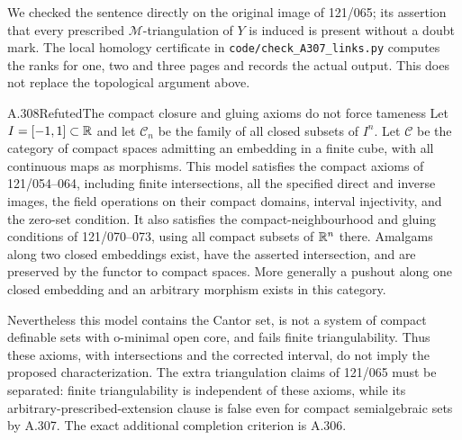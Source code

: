 We checked the sentence directly on the original image of 121/065;
its assertion that every prescribed $\mathcal M$-triangulation of $Y$
is induced is present without a doubt mark. The local homology
certificate in \texttt{code/check\_A307\_links.py} computes the ranks
for one, two and three pages and records the actual output. This
does not replace the topological argument above.

\begin{saresult}{A.308}{Refuted}{The compact closure and gluing axioms do not force tameness}
Let $I=[-1,1]\subset\mathbb R$ and let $\mathcal C_n$ be the family of
all closed subsets of $I^n$. Let $\mathcal C$ be the category of
compact spaces admitting an embedding in a finite cube, with all
continuous maps as morphisms. This model satisfies the compact
axioms of 121/054--064, including finite intersections, all the
specified direct and inverse images, the field operations on their
compact domains, interval injectivity, and the zero-set condition.
It also satisfies the compact-neighbourhood and gluing conditions
of 121/070--073, using all compact subsets of $\mathbb R^n$ there.
Amalgams along two closed embeddings exist, have the asserted
intersection, and are preserved by the functor to compact spaces.
More generally a pushout along one closed embedding and an
arbitrary morphism exists in this category.

Nevertheless this model contains the Cantor set, is not a system
of compact definable sets with o-minimal open core, and fails
finite triangulability. Thus these axioms, with intersections
and the corrected interval, do not imply the proposed
characterization. The extra triangulation claims of 121/065
must be separated: finite triangulability is independent of
these axioms, while its arbitrary-prescribed-extension clause
is false even for compact semialgebraic sets by A.307.
The exact additional completion criterion is A.306.
\end{saresult}
